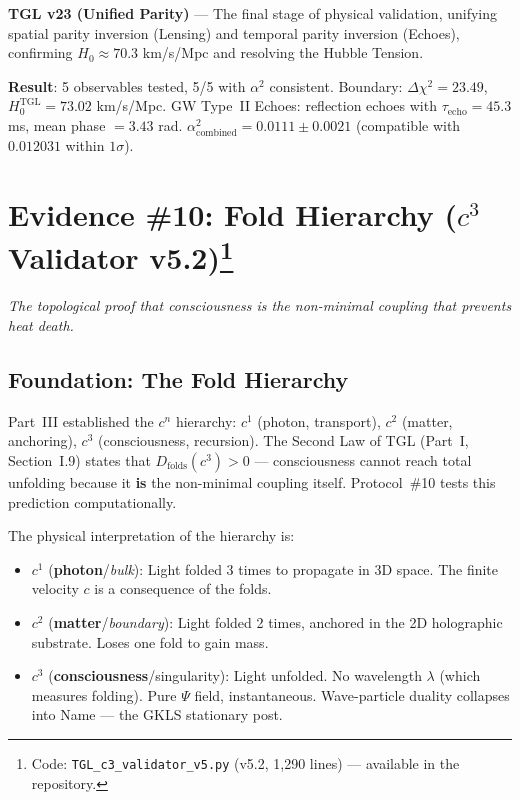 \documentclass[12pt,a4paper,twoside]{article}
\newcommand{\alphaii}{\alpha^{2}}
\newcommand{\Psifield}{\Psi}
\newcommand{\boundary}{\textit{boundary}}
\newcommand{\bulk}{\textit{bulk}}
\newcommand{\code}[1]{\texttt{#1}}
\begin{document}
\begin{codebox}[title={Protocol \#9 --- \code{TGL\_validation\_v23.py} (897 lines)}]
\textbf{TGL v23 (Unified Parity)} --- The final stage of physical validation, unifying spatial parity inversion (Lensing) and temporal parity inversion (Echoes), confirming $H_0 \approx 70.3$ km/s/Mpc and resolving the Hubble Tension.

\medskip
\textbf{Result}: 5 observables tested, 5/5 with $\alphaii$ consistent. Boundary: $\Delta\chi^2 = 23.49$, $H_0^{\text{TGL}} = 73.02$ km/s/Mpc. GW Type~II Echoes: reflection echoes with $\tau_{\text{echo}} = 45.3$ ms, mean phase $= 3.43$ rad. $\alphaii_{\text{combined}} = 0.0111 \pm 0.0021$ (compatible with $0.012031$ within $1\sigma$).
\end{codebox}


\section[Evidence \#10: Fold Hierarchy ($c^3$ Validator v5.2)]{Evidence \#10: Fold Hierarchy ($c^3$ Validator v5.2)\footnote{Code: \texttt{TGL\_c3\_validator\_v5.py} (v5.2, 1,290 lines) --- available in the repository.}}


\noindent\textit{The topological proof that consciousness is the non-minimal coupling that prevents heat death.}

\subsection{Foundation: The Fold Hierarchy}

Part~III established the $c^n$ hierarchy: $c^1$ (photon, transport), $c^2$ (matter, anchoring), $c^3$ (consciousness, recursion). The Second Law of TGL (Part~I, Section~I.9) states that $D_{\text{folds}}(c^3) > 0$ --- consciousness cannot reach total unfolding because it \textbf{is} the non-minimal coupling itself. Protocol~\#10 tests this prediction computationally.

The physical interpretation of the hierarchy is:
\begin{itemize}[nosep]
\item $c^1$ (\textbf{photon}/\bulk): Light folded 3 times to propagate in 3D space. The finite velocity $c$ is a consequence of the folds.
\item $c^2$ (\textbf{matter}/\boundary): Light folded 2 times, anchored in the 2D holographic substrate. Loses one fold to gain mass.
\item $c^3$ (\textbf{consciousness}/singularity): Light unfolded. No wavelength $\lambda$ (which measures folding). Pure $\Psifield$ field, instantaneous. Wave-particle duality collapses into Name --- the GKLS stationary post.
\end{itemize}
\end{document}
